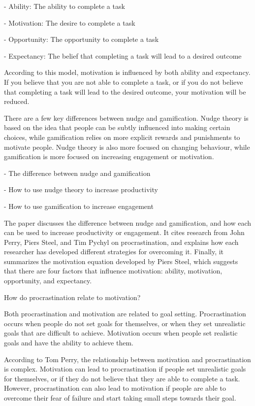 - Ability: The ability to complete a task

- Motivation: The desire to complete a task

- Opportunity: The opportunity to complete a task

- Expectancy: The belief that completing a task will lead to a desired outcome


According to this model, motivation is influenced by both ability and expectancy. If you believe that you are not able to complete a task, or if you do not believe that completing a task will lead to the desired outcome, your motivation will be reduced.



There are a few key differences between nudge and gamification. Nudge theory is based on the idea that people can be subtly influenced into making certain choices, while gamification relies on more explicit rewards and punishments to motivate people. Nudge theory is also more focused on changing behaviour, while gamification is more focused on increasing engagement or motivation.


- The difference between nudge and gamification

- How to use nudge theory to increase productivity

- How to use gamification to increase engagement


The paper discusses the difference between nudge and gamification, and how each can be used to increase productivity or engagement. It cites research from John Perry, Piers Steel, and Tim Pychyl on procrastination, and explains how each researcher has developed different strategies for overcoming it. Finally, it summarizes the motivation equation developed by Piers Steel, which suggests that there are four factors that influence motivation: ability, motivation, opportunity, and expectancy.



How do procrastination relate to motivation?

Both procrastination and motivation are related to goal setting. Procrastination occurs when people do not set goals for themselves, or when they set unrealistic goals that are difficult to achieve. Motivation occurs when people set realistic goals and have the ability to achieve them.


According to Tom Perry, the relationship between motivation and procrastination is complex. Motivation can lead to procrastination if people set unrealistic goals for themselves, or if they do not believe that they are able to complete a task. However, procrastination can also lead to motivation if people are able to overcome their fear of failure and start taking small steps towards their goal.


